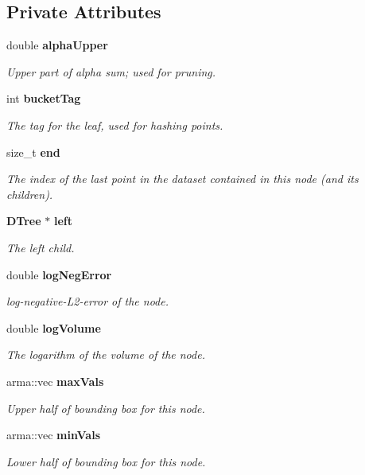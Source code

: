 \subsection*{Private Attributes}
\begin{DoxyCompactItemize}
\item 
double {\bf alpha\-Upper}
\begin{DoxyCompactList}\small\item\em Upper part of alpha sum; used for pruning. \end{DoxyCompactList}\item 
int {\bf bucket\-Tag}
\begin{DoxyCompactList}\small\item\em The tag for the leaf, used for hashing points. \end{DoxyCompactList}\item 
size\-\_\-t {\bf end}
\begin{DoxyCompactList}\small\item\em The index of the last point in the dataset contained in this node (and its children). \end{DoxyCompactList}\item 
{\bf D\-Tree} $\ast$ {\bf left}
\begin{DoxyCompactList}\small\item\em The left child. \end{DoxyCompactList}\item 
double {\bf log\-Neg\-Error}
\begin{DoxyCompactList}\small\item\em log-\/negative-\/\-L2-\/error of the node. \end{DoxyCompactList}\item 
double {\bf log\-Volume}
\begin{DoxyCompactList}\small\item\em The logarithm of the volume of the node. \end{DoxyCompactList}\item 
arma\-::vec {\bf max\-Vals}
\begin{DoxyCompactList}\small\item\em Upper half of bounding box for this node. \end{DoxyCompactList}\item 
arma\-::vec {\bf min\-Vals}
\begin{DoxyCompactList}\small\item\em Lower half of bounding box for this node. \end{DoxyCompactList}\item 

\end{DoxyCompactItemize}

